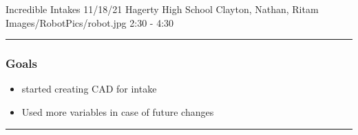 \insertmeeting 
	{Incredible Intakes} 
	{11/18/21}
	{Hagerty High School}
	{Clayton, Nathan, Ritam}
	{Images/RobotPics/robot.jpg}
	{2:30 - 4:30}
	
\noindent\hfil\rule{\textwidth}{.4pt}\hfil
\subsubsection*{Goals}
\begin{itemize}
    \item started creating CAD for intake
    \item Used more variables in case of future changes
 

\end{itemize} 

\noindent\hfil\rule{\textwidth}{.4pt}\hfil

